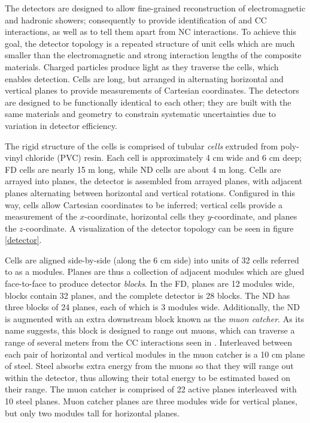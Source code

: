  The \nova detectors are designed to allow fine-grained reconstruction of electromagnetic and hadronic showers; consequently to provide identification of \numu and \nue CC interactions, as well as to tell them apart from NC interactions.  To achieve this goal, the detector topology is a repeated structure of unit cells which are much smaller than the electromagnetic and strong interaction lengths of the composite materials.  Charged particles produce light as they traverse the cells, which enables detection.  Cells are long, but arranged in alternating horizontal and vertical planes to provide measurements of Cartesian coordinates.  The detectors are designed to be functionally identical to each other; they are built with the same materials and geometry to constrain systematic uncertainties due to variation in detector efficiency.

 The rigid structure of the cells is comprised of tubular \textit{cells} extruded from poly-vinyl chloride (PVC) resin.  Each cell is approximately 4 cm wide and 6 cm deep; FD cells are nearly 15 m long, while ND cells are about 4 m long.  Cells are arrayed into planes, the detector is assembled from arrayed planes, with adjacent planes alternating between horizontal and vertical rotations.  Configured in this way, cells allow Cartesian coordinates to be inferred; vertical cells provide a measurement of the $x$-coordinate, horizontal cells they $y$-coordinate, and planes the $z$-coordinate.  A visualization of the detector topology can be seen in figure \ref{detector}.

 Cells are aligned side-by-side (along the 6 cm side) into units of 32 cells referred to as a modules.  Planes are thus a collection of adjacent modules which are glued face-to-face to produce detector \textit{blocks}.  In the FD, planes are 12 modules wide, blocks contain 32 planes, and the complete detector is 28 blocks.  The ND has three blocks of 24 planes, each of which is 3 modules wide.  Additionally, the ND is augmented with an extra downstream block known as the \textit{muon catcher}.  As its name suggests, this block is designed to range out muons, which can traverse a range of several meters from the \numu CC interactions seen  in \nova.  Interleaved between each pair of horizontal and vertical modules in the muon catcher is a 10 cm plane of steel.  Steel absorbs extra energy from the muons so that they will range out within the detector, thus allowing their total energy to be estimated based on their range.  The muon catcher is comprised of 22 active planes interleaved with 10 steel planes.  Muon catcher planes are three modules wide for vertical planes, but only two modules tall for horizontal planes.

